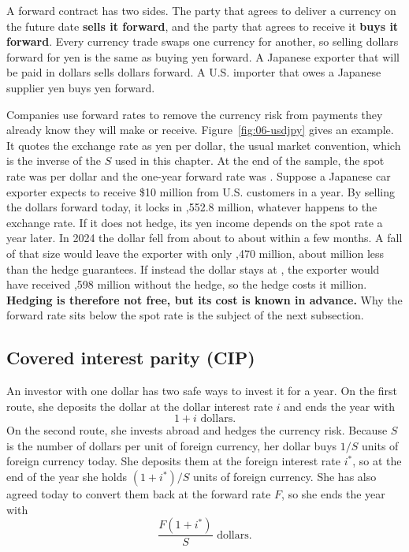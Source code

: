 A forward contract has two sides. The party that agrees to deliver a currency on the future date \textbf{sells it forward}, and the party that agrees to receive it \textbf{buys it forward}. Every currency trade swaps one currency for another, so selling dollars forward for yen is the same as buying yen forward. A Japanese exporter that will be paid in dollars sells dollars forward. A U.S. importer that owes a Japanese supplier yen buys yen forward.

Companies use forward rates to remove the currency risk from payments they already know they will make or receive. Figure~\ref{fig:06-usdjpy} gives an example. It quotes the exchange rate as yen per dollar, the usual market convention, which is the inverse of the $S$ used in this chapter. At the end of the sample, the spot rate was  per dollar and the one-year forward rate was . Suppose a Japanese car exporter expects to receive \$10 million from U.S. customers in a year. By selling the dollars forward today, it locks in ,552.8 million, whatever happens to the exchange rate. If it does not hedge, its yen income depends on the spot rate a year later. In 2024 the dollar fell from about  to about  within a few months. A fall of that size would leave the exporter with only ,470 million, about  million less than the hedge guarantees. If instead the dollar stays at , the exporter would have received ,598 million without the hedge, so the hedge costs it  million. \textbf{Hedging is therefore not free, but its cost is known in advance.} Why the forward rate sits below the spot rate is the subject of the next subsection.


\subsection{Covered interest parity (CIP)}

An investor with one dollar has two safe ways to invest it for a year. On the first route, she deposits the dollar at the dollar interest rate $i$ and ends the year with
\begin{equation}
  1 + i \text{ dollars.}
  \label{eq:06-cip-home}
\end{equation}
On the second route, she invests abroad and hedges the currency risk. Because $S$ is the number of dollars per unit of foreign currency, her dollar buys $1/S$ units of foreign currency today. She deposits them at the foreign interest rate $i^*$, so at the end of the year she holds $(1+i^*)/S$ units of foreign currency. She has also agreed today to convert them back at the forward rate $F$, so she ends the year with
\begin{equation}
  \frac{F(1+i^*)}{S} \text{ dollars.}
  \label{eq:06-cip-abroad}
\end{equation}

